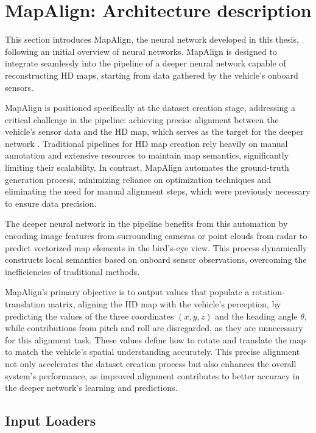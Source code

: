 \section{MapAlign: Architecture description}
This section introduces MapAlign, the neural network developed in this thesis, following an initial overview of neural networks. MapAlign is designed to integrate seamlessly into the pipeline of a deeper neural network capable of reconstructing HD maps, starting from data gathered by the vehicle's onboard sensors.

MapAlign is positioned specifically at the dataset creation stage, addressing a critical challenge in the pipeline: achieving precise alignment between the vehicle's sensor data and the HD map, which serves as the target for the deeper network \cite{Li_HDMapNet_2022}. Traditional pipelines for HD map creation rely heavily on manual annotation and extensive resources to maintain map semantics, significantly limiting their scalability. In contrast, MapAlign automates the ground-truth generation process, minimizing reliance on optimization techniques and eliminating the need for manual alignment steps, which were previously necessary to ensure data precision.

The deeper neural network in the pipeline benefits from this automation by encoding image features from surrounding cameras or point clouds from radar to predict vectorized map elements in the bird’s-eye view. This process dynamically constructs local semantics based on onboard sensor observations, overcoming the inefficiencies of traditional methods.

MapAlign’s primary objective is to output values that populate a rotation-translation matrix, aligning the HD map with the vehicle’s perception, by predicting the values of the three coordinates \( (x, y, z) \) and the heading angle \( \theta \), while contributions from pitch and roll are disregarded, as they are unnecessary for this alignment task. These values define how to rotate and translate the map to match the vehicle's spatial understanding accurately. This precise alignment not only accelerates the dataset creation process but also enhances the overall system’s performance, as improved alignment contributes to better accuracy in the deeper network's learning and predictions.


\subsection{Input Loaders}

